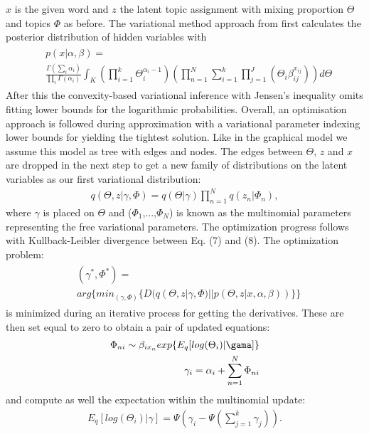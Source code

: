 $x$ is the given word and $z$ the latent topic assignment with mixing proportion $\Theta$ and topics $\Phi$ as before.
The variational method approach from \citet{blei2003latent} first calculates the posterior distribution of hidden variables with
\begin{align}
    \begin{split}
    &p(x|\alpha,\beta)=\\
    &\frac{\Gamma(\sum_i\alpha_i)}{\prod_i\Gamma(\alpha_i)}\int_K(\prod_{i=1}^{k}\Theta_i^{\alpha_i-1})(\prod_{n=1}^N\sum_{i=1}^k\prod_{j=1}^J(\Theta_i\beta_{ij}^{x_{ij}})) d\Theta
    \end{split}
\end{align}
After this the convexity-based variational inference with Jensen's inequality omits fitting lower bounds for the logarithmic probabilities. Overall, an optimisation approach is followed during approximation with a variational parameter indexing lower bounds for yielding the tightest solution. Like in the graphical model we assume this model as tree with edges and nodes. The edges between $\Theta$, $z$ and $x$ are dropped in the next step to get a new family of distributions on the latent variables as our first variational distribution:
\begin{align}
    q(\Theta,z|\gamma,\Phi)=q(\Theta|\gamma)\prod_{n=1}^Nq(z_n|\Phi_n),
\end{align}
where $\gamma$ is placed on $\Theta$ and ($\Phi_1$,...,$\Phi_N$) is known as the multinomial parameters representing the free variational parameters. 
The optimization progress follows with Kullback-Leibler divergence between Eq. (7) and (8). The optimization problem:
\begin{align}
    \begin{split}
    &(\gamma^{*},\Phi^{*})=\\
    &arg\{min_{(\gamma,\Phi)}\{D(q(\Theta,z|\gamma,\Phi)||p(\Theta,z|x,\alpha,\beta)) \}\}
    \end{split}
\end{align}
is minimized during an iterative process for getting the derivatives. These are then set equal to zero to obtain a pair of updated equations:
\begin{align}
    \Phi_{ni}\sim\beta_{ix_n}exp\{E_q[log(\Theta_i)|\gama]\} \\
    \gamma_i=\alpha_i+\sum_{n=1}^N\Phi_{ni}
\end{align}
and compute as well the expectation within the multinomial update: 
\begin{align}
    E_q[log(\Theta_i)|\gamma]=\Psi(\gamma_i-\Psi(\sum_{j=1}^k\gamma_j)).
\end{align}
